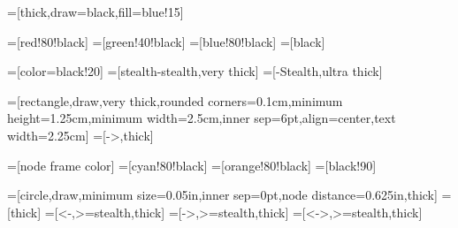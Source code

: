 \usetikzlibrary{intersections,positioning,arrows.meta,calc,backgrounds,fit,shapes.geometric,shapes.multipart}

\newcommand{\keyframe}{[style=keyframe] +(0,1) -- (0,0) -- +(1,0)}
\newcommand{\quadrotor}{[style=quadrotor]
+(-0.7,0.2) ellipse (0.4 and 0.2)
-- +(0.7,-0.2) ellipse (0.4 and 0.2)
+(0.5,0.4) ellipse (0.4 and 0.2)
-- +(-0.5,-0.4) ellipse (0.4 and 0.2)
}

=[thick,draw=black,fill=blue!15]

=[red!80!black]
=[green!40!black]
=[blue!80!black]
=[black]

=[color=black!20]
=[stealth-stealth,very thick]
=[-{Stealth},ultra thick]

=[rectangle,draw,very thick,rounded corners=0.1cm,minimum height=1.25cm,minimum width=2.5cm,inner sep=6pt,align=center,text width=2.25cm]
=[->,thick]

=[node frame color]
=[cyan!80!black]
=[orange!80!black]
=[black!90]

=[circle,draw,minimum size=0.05in,inner sep=0pt,node distance=0.625in,thick]
=[thick]
=[<-,>=stealth,thick]
=[->,>=stealth,thick]
=[<->,>=stealth,thick]